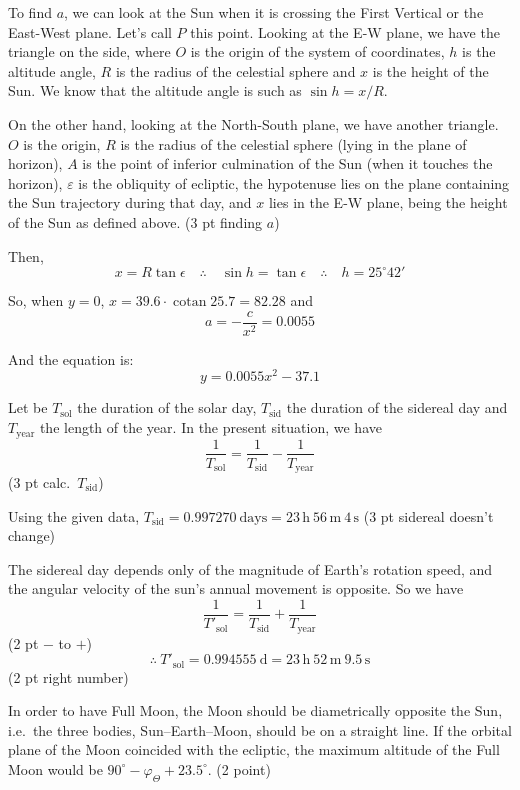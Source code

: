 To find $a$, we can look at the Sun when it is crossing the First Vertical or
the East-West plane. Let's call $P$ this point. Looking at the E-W plane, we
have the triangle on the side, where $O$ is the origin of the system of
coordinates, $h$ is the altitude angle, $R$ is the radius of the celestial
sphere and $x$ is the height of the Sun. We know that the altitude angle is
such as $\sin h = x/R$.


On the other hand, looking at the North-South plane, we have another
triangle. $O$ is the origin, $R$ is the radius of the celestial sphere (lying
in the plane of horizon), $A$ is the point of inferior culmination of the Sun
(when it touches the horizon), $\varepsilon$ is the obliquity of ecliptic,
the hypotenuse lies on the plane containing the Sun trajectory during that
day, and $x$ lies in the E-W plane, being the height of the Sun as defined
above.
\hfill(3 pt finding $a$)

Then,
\[
  x = R\tan\epsilon \quad\therefore\quad \sin h = \tan\epsilon
  \quad\therefore\quad h = 25^\circ 42'
\]

So, when $y = 0$, $x = 39.6 \cdot \operatorname{cotan} 25.7 = 82.28$ and
\[
  a = -\frac{c}{x^2} = 0.0055
\]

And the equation is:
\[
  y = 0.0055x^2 - 37.1
\]

Let be $T_{\mathrm{sol}}$ the duration of the solar day, $T_{\mathrm{sid}}$
the duration of the sidereal day and $T_{\mathrm{year}}$ the length of the
year. In the present situation, we have
\[
  \frac{1}{T_{\mathrm{sol}}} = \frac{1}{T_{\mathrm{sid}}}
    - \frac{1}{T_{\mathrm{year}}}
\]
\hfill(3 pt calc.\ $T_{\mathrm{sid}}$)

Using the given data,
$T_{\mathrm{sid}} = 0.997270\ \mathrm{days}
= 23\,\mathrm{h}\ 56\,\mathrm{m}\ 4\,\mathrm{s}$
\hfill(3 pt sidereal doesn't change)

The sidereal day depends only of the magnitude of Earth's rotation speed, and
the angular velocity of the sun's annual movement is opposite. So we have
\[
  \frac{1}{T'_{\mathrm{sol}}} = \frac{1}{T_{\mathrm{sid}}}
    + \frac{1}{T_{\mathrm{year}}}
\]
\hfill(2 pt $-$ to $+$)
\[
  \therefore\ T'_{\mathrm{sol}} = 0.994555\ \mathrm{d}
    = 23\,\mathrm{h}\ 52\,\mathrm{m}\ 9.5\,\mathrm{s}
\]
\hfill(2 pt right number)

In order to have Full Moon, the Moon should be diametrically opposite the
Sun, i.e.\ the three bodies, Sun--Earth--Moon, should be on a straight line.
If the orbital plane of the Moon coincided with the ecliptic, the maximum
altitude of the Full Moon would be
$90^\circ - \varphi_\Theta + 23.5^\circ$. \hfill(2 point)


